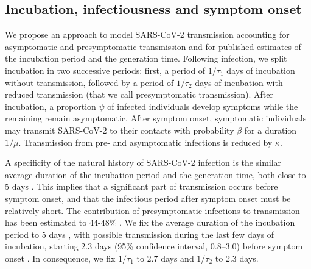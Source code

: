 \documentclass{article}
\begin{document}
		\subsection{Incubation, infectiousness and symptom onset}
		
		We propose an approach to model SARS-CoV-2 transmission accounting for asymptomatic and presymptomatic transmission and for published estimates of the incubation period and the generation time.
		Following infection, we split incubation in two successive periods: first, a period of $1/\tau_1$ days of incubation without transmission, followed by a period of $1/\tau_2$ days of incubation with reduced transmission (that we call presymptomatic transmission).
		After incubation, a proportion $\psi$ of infected individuals develop symptoms while the remaining remain asymptomatic. 
		After symptom onset, symptomatic individuals may transmit SARS-CoV-2 to their contacts with probability $\beta$ for a duration $1/\mu$.
		Transmission from pre- and asymptomatic infections is reduced by $\kappa$.

		A specificity of the natural history of SARS-CoV-2 infection is the similar average duration of the incubation period and the generation time, both close to 5 days \cite{bi2020epidemiology,li2020early,linton2020incubation,liu2020contribution,zhang2020evolving,ganyani2020estimating}.
		This implies that a significant part of transmission occurs before symptom onset, and that the infectious period after symptom onset must be relatively short.
		The contribution of presymptomatic infections to transmission has been estimated to 44-48\% \cite{liu2020contribution,ganyani2020estimating,he2020temporal}.
		We fix the average duration of the incubation period to 5 days \cite{bi2020epidemiology,li2020early,linton2020incubation,liu2020contribution,zhang2020evolving}, with possible transmission during the last few days of incubation, starting 2.3 days (95\% confidence interval, 0.8–3.0) before symptom onset \cite{he2020temporal}.
		In consequence, we fix $1/\tau_1$ to 2.7 days and $1/\tau_2$ to 2.3 days.
		
\end{document}

